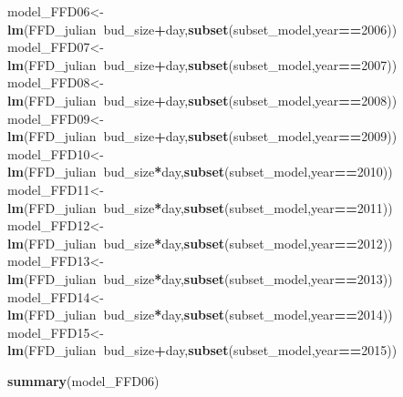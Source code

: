 \documentclass[]{article}
\newenvironment{Shaded}{\begin{snugshade}}{\end{snugshade}}
\newcommand{\KeywordTok}[1]{\textcolor[rgb]{0.13,0.29,0.53}{\textbf{#1}}}
\newcommand{\DecValTok}[1]{\textcolor[rgb]{0.00,0.00,0.81}{#1}}
\newcommand{\OperatorTok}[1]{\textcolor[rgb]{0.81,0.36,0.00}{\textbf{#1}}}
\newcommand{\NormalTok}[1]{#1}
\begin{document}
\begin{Shaded}
\begin{Highlighting}[]
\NormalTok{model_FFD06<-}\KeywordTok{lm}\NormalTok{(FFD_julian}\OperatorTok{~}\NormalTok{bud_size}\OperatorTok{+}\NormalTok{day,}\KeywordTok{subset}\NormalTok{(subset_model,year}\OperatorTok{==}\DecValTok{2006}\NormalTok{))}
\NormalTok{model_FFD07<-}\KeywordTok{lm}\NormalTok{(FFD_julian}\OperatorTok{~}\NormalTok{bud_size}\OperatorTok{+}\NormalTok{day,}\KeywordTok{subset}\NormalTok{(subset_model,year}\OperatorTok{==}\DecValTok{2007}\NormalTok{)) }
\NormalTok{model_FFD08<-}\KeywordTok{lm}\NormalTok{(FFD_julian}\OperatorTok{~}\NormalTok{bud_size}\OperatorTok{+}\NormalTok{day,}\KeywordTok{subset}\NormalTok{(subset_model,year}\OperatorTok{==}\DecValTok{2008}\NormalTok{)) }
\NormalTok{model_FFD09<-}\KeywordTok{lm}\NormalTok{(FFD_julian}\OperatorTok{~}\NormalTok{bud_size}\OperatorTok{+}\NormalTok{day,}\KeywordTok{subset}\NormalTok{(subset_model,year}\OperatorTok{==}\DecValTok{2009}\NormalTok{)) }
\NormalTok{model_FFD10<-}\KeywordTok{lm}\NormalTok{(FFD_julian}\OperatorTok{~}\NormalTok{bud_size}\OperatorTok{*}\NormalTok{day,}\KeywordTok{subset}\NormalTok{(subset_model,year}\OperatorTok{==}\DecValTok{2010}\NormalTok{)) }
\NormalTok{model_FFD11<-}\KeywordTok{lm}\NormalTok{(FFD_julian}\OperatorTok{~}\NormalTok{bud_size}\OperatorTok{*}\NormalTok{day,}\KeywordTok{subset}\NormalTok{(subset_model,year}\OperatorTok{==}\DecValTok{2011}\NormalTok{)) }
\NormalTok{model_FFD12<-}\KeywordTok{lm}\NormalTok{(FFD_julian}\OperatorTok{~}\NormalTok{bud_size}\OperatorTok{*}\NormalTok{day,}\KeywordTok{subset}\NormalTok{(subset_model,year}\OperatorTok{==}\DecValTok{2012}\NormalTok{)) }
\NormalTok{model_FFD13<-}\KeywordTok{lm}\NormalTok{(FFD_julian}\OperatorTok{~}\NormalTok{bud_size}\OperatorTok{*}\NormalTok{day,}\KeywordTok{subset}\NormalTok{(subset_model,year}\OperatorTok{==}\DecValTok{2013}\NormalTok{)) }
\NormalTok{model_FFD14<-}\KeywordTok{lm}\NormalTok{(FFD_julian}\OperatorTok{~}\NormalTok{bud_size}\OperatorTok{*}\NormalTok{day,}\KeywordTok{subset}\NormalTok{(subset_model,year}\OperatorTok{==}\DecValTok{2014}\NormalTok{)) }
\NormalTok{model_FFD15<-}\KeywordTok{lm}\NormalTok{(FFD_julian}\OperatorTok{~}\NormalTok{bud_size}\OperatorTok{+}\NormalTok{day,}\KeywordTok{subset}\NormalTok{(subset_model,year}\OperatorTok{==}\DecValTok{2015}\NormalTok{)) }

\KeywordTok{summary}\NormalTok{(model_FFD06)}
\end{Highlighting}
\end{Shaded}
\end{document}
